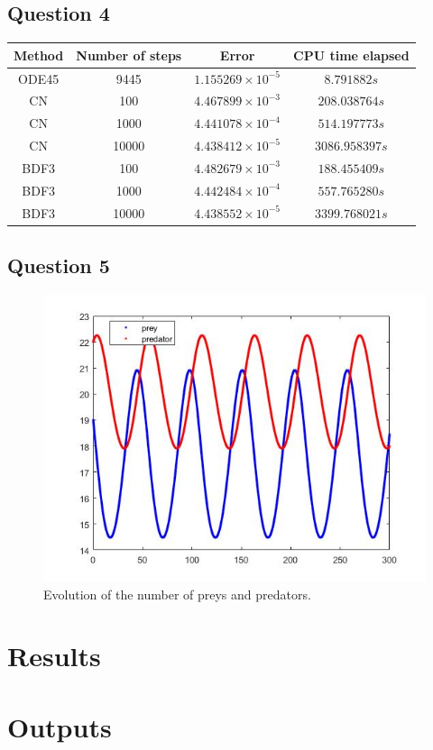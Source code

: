 \documentclass[a4paper, 11pt]{article}
\begin{document}
	
	\subsection*{Question 4}
	
	\begin{table}[H]
		\centering
		\begin{tabular}{c|c|c|c}
			\textbf{Method} & \textbf{Number of steps} 	& \textbf{Error}  				& \textbf{CPU time elapsed}  	\\ \hline
			ODE45 			& 9445 						& $ 1.155269\times 10^{-5} $ 	& $ 8.791882 s $ 	\\ \hline 
			CN 				& 100 						& $ 4.467899\times 10^{-3} $ 	& $ 208.038764 s $ 				\\ \hline
			CN 				& 1000 						& $ 4.441078\times 10^{-4} $ 	& $ 514.197773 s $ 				\\ \hline
			CN 				& 10000 					& $ 4.438412\times 10^{-5} $ 	& $ 3086.958397 s $				\\ \hline
			BDF3 			& 100				 		& $ 4.482679\times 10^{-3} $ 	& $ 188.455409 s $ 				\\ \hline
			BDF3 			& 1000						& $ 4.442484\times 10^{-4} $ 	& $ 557.765280 s $ 				\\ \hline
			BDF3 			& 10000 					& $ 4.438552\times 10^{-5} $ 	& $ 3399.768021 s $ 			\\ \hline
		\end{tabular}
	\end{table}

	
	\subsection*{Question 5}
	
	\begin{figure}[H]
		\centering
		\includegraphics[width=\linewidth]{ex5.jpg}
		\caption{Evolution of the number of preys and predators.}
		\label{fig:ex5}
	\end{figure}

	
	\section*{Results}
	
	
	\section*{Outputs}
	
	
	
\end{document}
